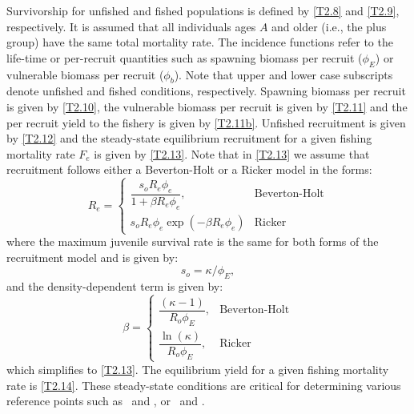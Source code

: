 Survivorship for unfished and fished populations is defined by \eqref{T2.8} and \eqref{T2.9}, respectively.  It is assumed that all individuals ages $A$ and older (i.e., the plus group) have the same total mortality rate.  The incidence functions refer to the life-time or per-recruit quantities such as spawning biomass per recruit ($\phi_E$) or vulnerable biomass per recruit ($\phi_b$).  Note that upper and lower case subscripts denote unfished and fished conditions, respectively.  Spawning biomass per recruit is given by \eqref{T2.10}, the vulnerable biomass per recruit is given by \eqref{T2.11} and the per recruit yield to the fishery is given by \eqref{T2.11b}.  Unfished recruitment is given by \eqref{T2.12} and the steady-state equilibrium recruitment  for a given fishing mortality rate $F_e$ is given by \eqref{T2.13}.  Note that in \eqref{T2.13} we assume that recruitment follows either a  Beverton-Holt or a Ricker model in the forms:
\[
R_e=\begin{cases}
    \dfrac{s_o R_e \phi_e}{1+\beta R_e \phi_e},& \mbox{Beverton-Holt}\\[5ex]
    s_o R_e \phi_e \exp(-\beta R_e \phi_e)& \mbox{Ricker}
\end{cases}
\]
where the maximum juvenile survival rate is the same for both forms of the recruitment model and is given by:
\[
s_o = \kappa/\phi_E,
\]
and the density-dependent term is given by:
\[
\beta =\begin{cases}
    \dfrac{(\kappa-1)}{R_o\phi_E}, & \mbox{Beverton-Holt}\\[5ex]
    {\dfrac {\ln  \left( \kappa \right) }{R_{{o}}\phi_{{E}}}}, & \mbox{Ricker}
\end{cases} 
\]
which simplifies to \eqref{T2.13}.
 The equilibrium yield for a given fishing mortality rate is \eqref{T2.14}.  These steady-state conditions are critical for determining various reference points such as \fmsy\ and \bmsy, or \fspr\ and \bspr.  



%








